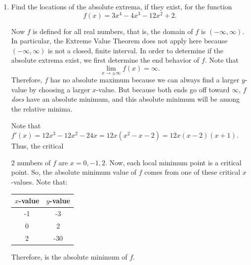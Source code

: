 \documentclass{book}
\begin{document}
\begin{Exam} \mbox{}
\begin{enumerate}
\item Find the locations of the absolute extrema, if they exist, for the function \[f(x) = 3x^4 - 4x^3 - 12x^2 + 2.\]

Now $f$ is defined for all real numbers, that is, the domain of $f$ is $(-\infty, \infty)$. In particular, the Extreme Value Theorem does not apply here because $(-\infty, \infty)$ is not a closed, finite interval. In order to determine if the absolute extrema exist, we first determine the end behavior of $f$. Note that \[\lim_{x\to \pm \infty} f(x) = \infty.\] Therefore, $f$ has no absolute maximum because we can always find a larger $y$-value by choosing a larger $x$-value. But because both ends go off toward $\infty$, $f$ \emph{does} have an absolute minimum, and this absolute minimum will be among the relative minima.

Note that $f'(x) = 12x^3 - 12x^2 - 24x = 12x(x^2- x - 2) = 12x(x-2)(x+1)$. Thus, the critical \vspace{-12pt}

\begin{multicols}{2}
numbers of $f$ are $x=0, -1, 2$.  Now, each local minimum point is a critical point.  So, the absolute minimum value of $f$ comes from one of these critical $x$-values. Note that:
\begin{center}
\begin{tabular}{c|c}
$x$-value & $y$-value \\ \hline
-1 & -3 \\ 
0 & 2 \\ 
2 & -30 \\ 
\end{tabular}
\end{center}
Therefore,  is the absolute minimum of $f$. \vfill\mbox{}\columnbreak
\begin{center}
\end{center}
\end{multicols}\vspace{-15pt}


\end{enumerate}
\end{Exam}
\end{document}
